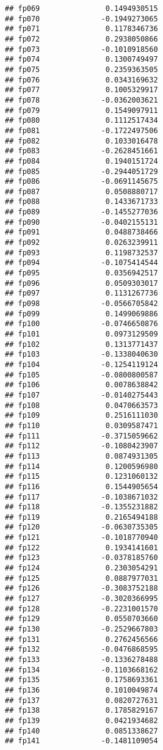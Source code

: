 \documentclass[]{article}
\begin{document}
\begin{verbatim}
## fp069               0.1494930515
## fp070              -0.1949273065
## fp071               0.1178346736
## fp072               0.2938050866
## fp073              -0.1010918560
## fp074               0.1300749497
## fp075               0.2359363505
## fp076               0.0343169632
## fp077               0.1005329917
## fp078              -0.0362003621
## fp079               0.1549097911
## fp080               0.1112517434
## fp081              -0.1722497506
## fp082               0.1033016478
## fp083              -0.2628451661
## fp084               0.1940151724
## fp085              -0.2944051729
## fp086              -0.0691145675
## fp087               0.0508880717
## fp088               0.1433671733
## fp089              -0.1455277036
## fp090              -0.0402155131
## fp091               0.0488738466
## fp092               0.0263239911
## fp093               0.1198732537
## fp094              -0.1075414544
## fp095               0.0356942517
## fp096               0.0509303017
## fp097               0.1131267736
## fp098              -0.0566705842
## fp099               0.1499069886
## fp100              -0.0746650876
## fp101               0.0973129509
## fp102               0.1313771437
## fp103              -0.1338040630
## fp104              -0.1254119124
## fp105              -0.0800800587
## fp106               0.0078638842
## fp107              -0.0140275443
## fp108               0.0470663573
## fp109               0.2516111030
## fp110               0.0309587471
## fp111              -0.3715059662
## fp112              -0.1080423907
## fp113               0.0874931305
## fp114               0.1200596980
## fp115               0.1231060132
## fp116               0.1544905654
## fp117              -0.1038671032
## fp118              -0.1355231882
## fp119               0.2165494188
## fp120              -0.0630735305
## fp121              -0.1018770940
## fp122               0.1934141601
## fp123              -0.0378185760
## fp124               0.2303054291
## fp125               0.0887977031
## fp126              -0.3083752188
## fp127              -0.3020366995
## fp128              -0.2231001570
## fp129               0.0550703660
## fp130              -0.2529667803
## fp131               0.2762456566
## fp132              -0.0476868595
## fp133              -0.1336278488
## fp134              -0.1103668162
## fp135               0.1758693361
## fp136               0.1010049874
## fp137               0.0820727631
## fp138               0.1785829167
## fp139               0.0421934682
## fp140               0.0851338627
## fp141              -0.1481109054

\end{verbatim}
\end{document}
